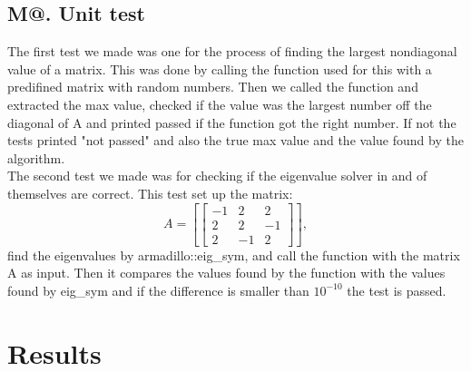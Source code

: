 \documentclass[%
reprint,
amsmath, 
amssymb, 
aps,]{revtex4-1}
\makeatletter
\newcommand*{\rom}[1]{\expandafter\@slowromancap\romannumeral #1@}
\makeatother
\begin{document}
		\subsection*{M\rom{5}. Unit test} \noindent
The first test we made was one for the process of finding the largest nondiagonal value of a matrix. This was done by calling the function used for this with a predifined matrix with random numbers. Then we called the function and extracted the max value, checked if the value was the largest number off the diagonal of A and printed passed if the function got the right number. If not the tests printed "not passed" and also the true max value and the value found by the algorithm. \\

The second test we made was for checking if the eigenvalue solver in and of themselves are correct. This test set up the matrix: 
			\begin{equation}
A = \left[
				\begin{bmatrix}
-1 & 2 & 2 \\
2 & 2 & -1 \\
2 & -1 & 2
				\end{bmatrix}
\right],
			\end{equation}
find the eigenvalues by armadillo::eig\_sym, and call the function with the matrix A as input. Then it compares the values found by the function with the values found by eig\_sym and if the difference is smaller than $10^{-10}$ the test is passed.

\newpage 

	\section*{Results}
\end{document}
